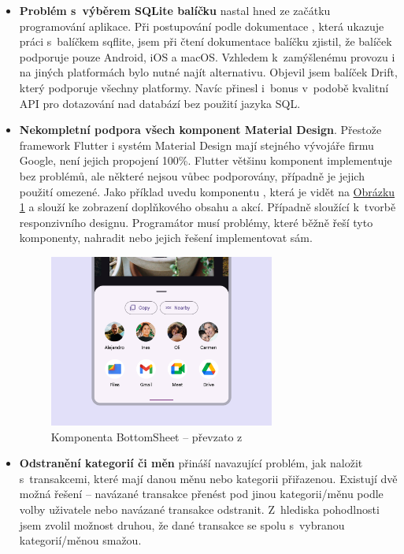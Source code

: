 \documentclass[
  biblatex,
  figures=true,
  tables=false,
  glossaries,
  index
]{kidiplom}
\begin{document}
\begin{itemize}
  \item \textbf{Problém s~výběrem SQLite balíčku} nastal hned ze začátku programování aplikace. Při postupování podle dokumentace \cite{flutter-docs}, která ukazuje práci s~balíčkem sqflite, jsem při čtení dokumentace balíčku zjistil, že balíček podporuje pouze Android, iOS a macOS. Vzhledem k~zamýšlenému provozu i na jiných platformách bylo nutné najít alternativu. Objevil jsem balíček Drift, který podporuje všechny platformy. Navíc přinesl i~bonus v~podobě kvalitní API pro dotazování nad databází bez použití jazyka SQL.
  \item \textbf{Nekompletní podpora všech komponent Material Design}. Přestože framework Flutter i systém Material Design mají stejného vývojáře firmu Google, není jejich propojení 100\%. Flutter většinu komponent implementuje bez problémů, ale některé nejsou vůbec podporovány, případně je jejich použití omezené. Jako příklad uvedu komponentu , která je vidět na \hyperref[fig:bottomsheet]{Obrázku \ref{fig:bottomsheet}} a slouží ke zobrazení doplňkového obsahu a akcí. Případně  sloužící k~tvorbě responzivního designu. Programátor musí problémy, které běžně řeší tyto komponenty, nahradit nebo jejich řešení implementovat sám.
  \begin{figure}
    \centering
    \includegraphics[width=0.7\textwidth]{images/bottom-sheet.png}
    \caption{Komponenta BottomSheet -- převzato z~\cite{m3}}
    \label{fig:bottomsheet}
  \end{figure}
  \item \textbf{Odstranění kategorií či měn} přináší navazující problém, jak naložit s~transakcemi, které mají danou měnu nebo kategorii přiřazenou. Existují dvě možná řešení -- navázané transakce přenést pod jinou kategorii/měnu podle volby uživatele nebo navázané transakce odstranit. Z~hlediska pohodlnosti jsem zvolil možnost druhou, že dané transakce se spolu s~vybranou kategorií/měnou smažou.
\end{itemize}
\end{document}
